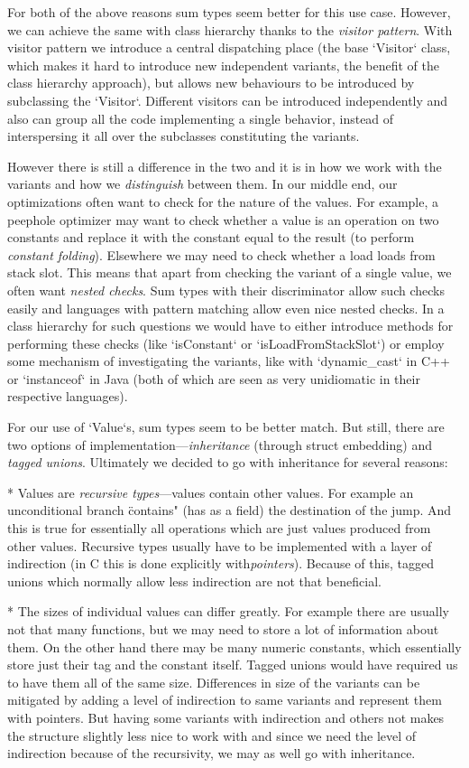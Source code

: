 For both of the above reasons sum types seem better for this use case. However,
we can achieve the same with class hierarchy thanks to the {\em visitor
pattern}. With visitor pattern we introduce a central dispatching place (the
base `Visitor` class, which makes it hard to introduce new independent variants,
the benefit of the class hierarchy approach), but allows new behaviours to be
introduced by subclassing the `Visitor`. Different visitors can be introduced
independently and also can group all the code implementing a single behavior,
instead of interspersing it all over the subclasses constituting the variants.

However there is still a difference in the two and it is in how we work with the
variants and how we {\em distinguish} between them. In our middle end, our
optimizations often want to check for the nature of the values. For example, a
peephole optimizer may want to check whether a value is an operation on
two constants and replace it with the constant equal to the result (to perform
{\em constant folding}). Elsewhere we may need to check whether a load
loads from stack slot. This means that apart from checking the variant of a
single value, we often want {\em nested checks}. Sum types with their
discriminator allow such checks easily and languages with pattern matching allow
even nice nested checks. In a class hierarchy for such questions we would have
to either introduce methods for performing these checks (like `isConstant` or
`isLoadFromStackSlot`) or employ some mechanism of investigating the variants,
like with `dynamic_cast` in C++ or `instanceof` in Java (both of which are seen
as very unidiomatic in their respective languages).

For our use of `Value`s, sum types seem to be better match. But still, there are
two options of implementation---{\em inheritance} (through struct embedding) and
{\em tagged unions}. Ultimately we decided to go with inheritance for several
reasons:

\begitems
* Values are {\em recursive types}---values contain other values. For example an
unconditional branch \"contains" (has as a field) the destination of the jump.
And this is true for essentially all operations which are just values produced
from other values. Recursive types usually have to be implemented with a layer
of indirection (in C this is done explicitly with{\em pointers}). Because of
this, tagged unions which normally allow less indirection are not that
beneficial.

* The sizes of individual values can differ greatly. For example there are
usually not that many functions, but we may need to store a lot of information
about them. On the other hand there may be many numeric constants, which
essentially store just their tag and the constant itself. Tagged unions would
have required us to have them all of the same size. Differences in size of
the variants can be mitigated by adding a level of indirection to same variants
and represent them with pointers. But having some variants with indirection and
others not makes the structure slightly less nice to work with and since we need
the level of indirection because of the recursivity, we may as well go with
inheritance.

